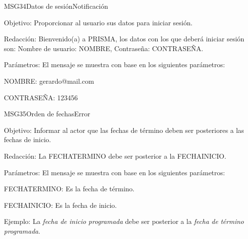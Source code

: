 \begin{mensaje}{MSG34}{Datos de sesión}{Notificación}
    \item[Objetivo:] Proporcionar al usuario sus datos para iniciar sesión.
    \item[Redacción:] Bienvenido(a) a PRISMA, los datos con los que deberá iniciar sesión son: Nombre de usuario: NOMBRE, Contraseña: CONTRASEÑA.
    \item[Parámetros:] El mensaje se muestra con base en los siguientes parámetros:
    \begin{Citemize}
	\item NOMBRE: gerardo@mail.com
	\item CONTRASEÑA: 123456
    \end{Citemize}
\end{mensaje}

\begin{mensaje}{MSG35}{Orden de fechas}{Error}
    \item[Objetivo:] Informar al actor que las fechas de término deben ser posteriores a las fechas de inicio.
    \item[Redacción:] La FECHATERMINO debe ser posterior a la FECHAINICIO.
    \item[Parámetros:] El mensaje se muestra con base en los siguientes parámetros:
    \begin{Citemize}
	\item FECHATERMINO: Es la fecha de término.
	\item FECHAINICIO: Es la fecha de inicio.
    \end{Citemize}
    \item[Ejemplo:] La {\em fecha de inicio programada} debe ser posterior a la {\em fecha de término programada}.
\end{mensaje}

